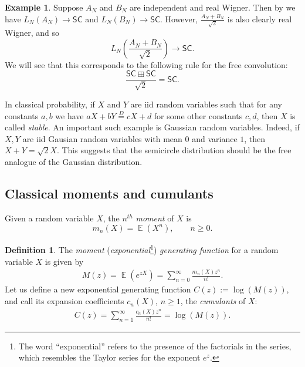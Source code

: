 \documentclass[letterpaper,11pt,oneside,reqno]{amsart}
\numberwithin{equation}{section}
\newcommand{\SC}{\mathsf{SC}}
\DeclareMathOperator{\EE}{\mathbb{E}}
\theoremstyle{definition}
\newtheorem{definition}[proposition]{Definition}
\newtheorem{example}[proposition]{Example}
\begin{document}
\begin{example}
	Suppose $A_N$ and $B_N$ are independent and real Wigner. 
	Then by  we have
	$L_N(A_N)\to \SC$ and $L_N(B_N)\to \SC$. However, 
	$\displaystyle\frac{A_N+B_N}{\sqrt{2}}$ is also clearly real Wigner, and so
	\begin{equation*}
		L_N\left(\frac{A_N+B_N}{\sqrt{2}}\right) \to \SC.
	\end{equation*}
	We will see that this corresponds to the following
	rule for the free convolution:
	\begin{equation}\label{free_conv_SC}
		\frac{\SC\boxplus\SC}{\sqrt{2}}=\SC.
	\end{equation}

	In classical probability, if $X$ and $Y$ are iid random variables 
	such that for any constants $a,b$ we have 
	$aX+bY\stackrel{D}{=} cX+d$ for some other constants $c,d$, then $X$ is called
	\emph{stable}. An important such example is Gaussian random variables.
	Indeed, if  $X,Y$ are iid Gausian random variables with mean $0$
	and variance $1$, then
	$X+Y=\sqrt{2}X$.  
	This suggests that the semicircle distribution should
	be the free analogue of the Gaussian distribution.
\end{example}


\subsection{Classical moments and cumulants} %
\label{sub:classical_moments_and_cumulants}

Given a random variable $X$, the $n^{th}$ \emph{moment} of $X$ is
\begin{equation*}
	m_n(X)=\EE(X^n),\qquad n\geq 0.
\end{equation*}

\begin{definition}
The \emph{moment} (\emph{exponential}\footnote{The word
``exponential'' refers to the presence of the factorials in the series, which
resembles the Taylor series for the exponent $e^{z}$.}) \emph{generating function} for a random variable $X$ is given by 
\begin{align}\label{Moment_Gen}
\displaystyle M(z)=\EE (e^{z X})=\sum_{n=0}^\infty \frac{m_n(X)z^n}{n!}.
\end{align}
Let us define a new exponential generating function $C(z):=\log(M(z))$, and call its expansion coefficients $c_n(X)$, $n\ge1$,
the \emph{cumulants} of $X$:
\begin{align}\label{Cumulant_Gen}
\displaystyle C(z)=\sum_{n=1}^\infty \frac{c_n(X)z^n}{n!}=\log(M(z)).
\end{align}
\end{definition}
\end{document}
